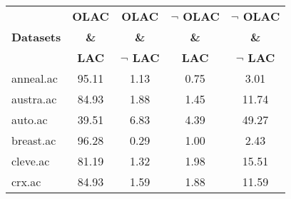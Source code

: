 \begin{table}[htbp]
	\centering
		\begin{tabular}{|l|c|c|c|c|}
		\hline
				& \textbf{OLAC}		& \textbf{OLAC}			& \textbf{$\neg$ OLAC}	& \textbf{$\neg$ OLAC}	\\
		\textbf{Datasets}	& \textbf{\&}		& \textbf{\&}			& \textbf{\&}			& \textbf{\&}			\\
				& \textbf{LAC}		& \textbf{$\neg$ LAC}		& \textbf{LAC}			& \textbf{$\neg$ LAC}		\\
		\hline
		anneal.ac       & 95.11         & 1.13               & 0.75                     & 3.01                          \\
		\hline
		austra.ac       & 84.93         & 1.88               & 1.45                     & 11.74                         \\
		\hline
		auto.ac         & 39.51         & 6.83               & 4.39                     & 49.27                         \\
		\hline
		breast.ac       & 96.28         & 0.29               & 1.00                     & 2.43                          \\
		\hline
		cleve.ac        & 81.19         & 1.32               & 1.98                     & 15.51                         \\
		\hline
		crx.ac          & 84.93         & 1.59               & 1.88                     & 11.59                         \\
		\hline

\end{tabular}
\end{table}
